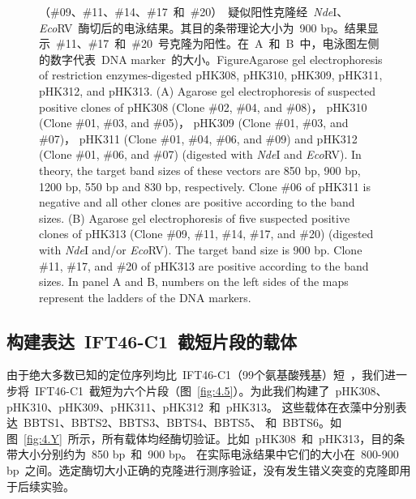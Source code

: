 \begin{figure}[h!tbp]
{{（\#09、\#11、\#14、\#17\ 和\ \#20）\ 疑似阳性克隆经\ \textit{Nde}I、\textit{Eco}RV\ 酶切后的电泳结果。其目的条带理论大小为\ 900 bp。结果显示\ \#11、\#17\ 和\ \#20\ 号克隆为阳性。在\ A\ 和\ B\ 中，电泳图左侧的数字代表\ DNA marker\ 的大小。}{Figure}{Agarose gel electrophoresis of restriction enzymes-digested pHK308, pHK310, pHK309, pHK311, pHK312, and pHK313. (A) Agarose gel electrophoresis of suspected positive clones of pHK308 (Clone \#02, \#04, and \#08)， pHK310 (Clone \#01, \#03, and \#05)， pHK309 (Clone \#01, \#03, and \#07)， pHK311 (Clone \#01, \#04, \#06, and \#09) and pHK312 (Clone \#01, \#06, and \#07) (digested with \textit{Nde}I and \textit{Eco}RV). In theory, the target band sizes of these vectors are 850 bp, 900 bp, 1200 bp, 550 bp and 830 bp, respectively. Clone \#06 of pHK311 is negative and all other clones are positive according to the band sizes. (B) Agarose gel electrophoresis of five suspected positive clones of pHK313 (Clone \#09, \#11, \#14, \#17, and \#20) (digested with \textit{Nde}I and/or \textit{Eco}RV). The target band size is 900 bp. Clone \#11, \#17, and \#20 of pHK313 are positive according to the band sizes. In panel A and B, numbers on the left sides of the maps represent the ladders of the DNA markers.}
\par}
\end{figure}

\subsection{构建表达\ IFT46-C1\ 截短片段的载体}
由于绝大多数已知的定位序列均比\ IFT46-C1（99个氨基酸残基）短\
\citep{Malicki2014,Bhogaraju2013,McIntyre2015,Dishinger2010,Berbari2008,Hurd2011,Santos2014}，我们进一步将\ IFT46-C1\ 截短为六个片段（图\ \ref{fig:4.5}）。为此我们构建了\ pHK308、pHK310、pHK309、pHK311、pHK312\ 和\ pHK313。 这些载体在衣藻中分别表达\ BBTS1、BBTS2、BBTS3、BBTS4、BBTS5、 和\ BBTS6。如
图\ \ref{fig:4.Y}\ 所示，所有载体均经酶切验证。比如\ pHK308\ 和\ pHK313，目的条带大小分别约为\ 850 bp\ 和\ 900 bp。 在实际电泳结果中它们的大小在\ 800-900 bp\ 之间。选定酶切大小正确的克隆进行测序验证，没有发生错义突变的克隆即用于后续实验。

